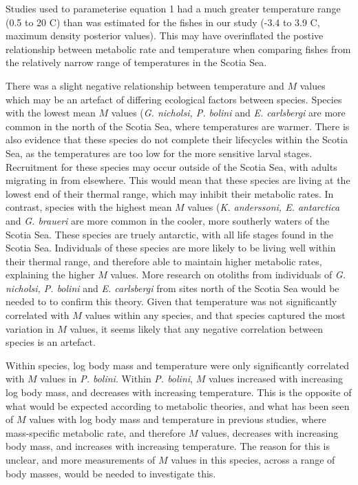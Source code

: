 \documentclass[12pt, titlepage]{article}
\begin{document}
Studies used to parameterise equation 1 had a much greater temperature range (0.5 to 20 \textdegree C) than was estimated for the fishes in our study (-3.4 to 3.9 \textdegree C, maximum density posterior values).
This may have overinflated the postive relationship between metabolic rate and temperature when comparing fishes from the relatively narrow range of temperatures in the Scotia Sea.

There was a slight negative relationship between temperature and $M$ values which may be an artefact of differing ecological factors between species.
Species with the lowest mean $M$ values (\textit{G. nicholsi, P. bolini} and \textit{E. carlsbergi} are more common in the north of the Scotia Sea, %
where temperatures are warmer.
There is also evidence that these species do not complete their lifecycles within the Scotia Sea, as the temperatures are too low for the more sensitive larval stages.
Recruitment for these species may occur outside of the Scotia Sea, with adults migrating in from elsewhere. %
This would mean that these species are living at the lowest end of their thermal range, which may inhibit their metabolic rates. %
In contrast, species with the highest mean $M$ values (\textit{K. anderssoni, E. antarctica} and \textit{G. braueri} are more common in the cooler, more southerly waters of the Scotia Sea.
These species are truely antarctic, with all life stages found in the Scotia Sea.
Individuals of these species are more likely to be living well within their thermal range, and therefore able to maintain higher metabolic rates, explaining the higher $M$ values.
More research on otoliths from individuals of \textit{G. nicholsi, P. bolini} and \textit{E. carlsbergi} from sites north of the Scotia Sea would be needed to to confirm this theory. 
Given that temperature was not significantly correlated with $M$ values within any species, and that species captured the most variation in $M$ values, it seems likely that any negative correlation between species is an artefact.

Within species, log body mass and temperature were only significantly correlated with $M$ values in \textit{P. bolini}.
Within \textit{P. bolini}, $M$ values increased with increasing log body mass, and decreases with increasing temperature.
This is the opposite of what would be expected according to metabolic theories, and what has been seen of $M$ values with log body mass and temperature in previous studies, where mass-specific metabolic rate, and therefore $M$ values, decreases with increasing body mass, and increases with increasing temperature. %
The reason for this is unclear, and more measurements of $M$ values in this species, across a range of body masses, would be needed to investigate this.
\end{document}
